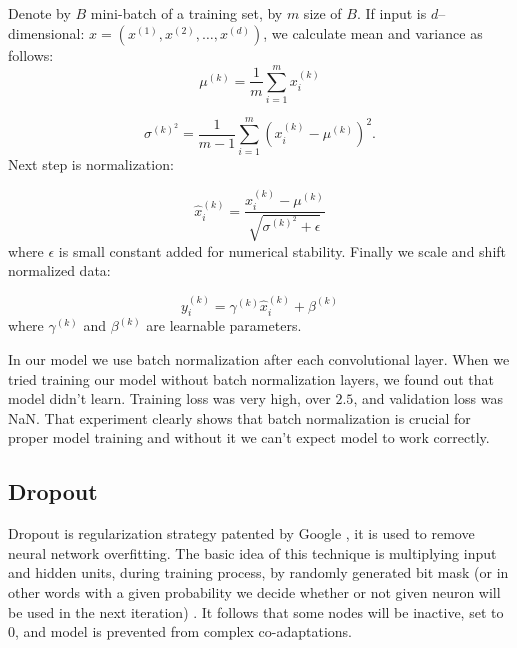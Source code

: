 \documentclass[licencjacka,en]{pracamgr}
\begin{document}
	Denote by $B$ mini-batch of a training set, by $m$ size of $B$. If input is $d$--dimensional: $x = (x^{(1)}, x^{(2)}, \ldots, x^{(d)})$, we calculate mean and variance as follows:
	$$\mu^{(k)} = \frac{1}{m}\sum_{i=1}^m x^{(k)}_i$$
	
	$$ \sigma^{{(k)}^2} = \frac{1}{m-1} \sum_{i = 1}^{m} \left(x^{(k)}_i - \mu^{(k)}\right) ^ 2.$$
	Next step is normalization:
	
	$$
	\hat{x} ^ {(k)} _ i = \frac{x^{(k)}_i - \mu^{(k)}} {\sqrt{ \sigma^{{(k)}^2} + \epsilon}}
	$$
	where $\epsilon$ is small constant added for numerical stability. Finally we scale and shift normalized data:
	
	$$ y^{(k)}_i = \gamma^{(k)} \hat{x}^{(k)}_i + \beta^{(k)}$$
	where $\gamma^{(k)}$ and $\beta^{(k)}$ are learnable parameters.
	
	In our model we use batch normalization after each convolutional layer. When we tried training our model without batch normalization layers, we found out that model didn't learn. Training loss was very high, over $2.5$, and validation loss was NaN. That experiment clearly shows that batch normalization is crucial for proper model training and without it we can't expect model to work correctly.
	
	\subsection{Dropout}
	Dropout is regularization strategy patented by Google \cite{DROPG}, it is used to remove neural network overfitting. The basic idea of this technique is multiplying input and hidden units, during training process, by randomly generated bit mask (or in other words with a given probability we decide whether or not given neuron will be used in the next iteration) \cite{DROPW}. It follows that some nodes will be inactive, set to 0, and model is prevented from complex co-adaptations.
	
	\dropouticm
	
\end{document}
